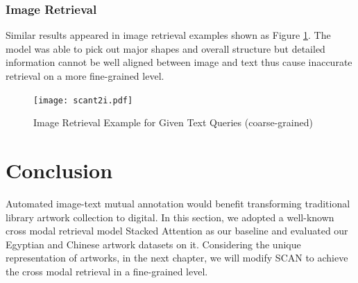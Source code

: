 \subsubsection{Image Retrieval}
Similar results appeared in image retrieval examples shown as Figure \ref{fig:scant2i}. The model was able to pick out major shapes and overall structure but detailed information cannot be well aligned between image and text thus cause inaccurate retrieval on a more fine-grained level.

\begin{figure}[h!]
\centering
\texttt{[image: scant2i.pdf]}
\caption{Image Retrieval Example for Given Text Queries (coarse-grained)}
\label{fig:scant2i}
\end{figure}


\section{Conclusion}
Automated image-text mutual annotation would benefit transforming traditional library artwork collection to digital. In this section, we adopted a well-known cross modal retrieval model Stacked Attention as our baseline and evaluated our Egyptian and Chinese artwork datasets on it. Considering the unique representation of artworks, in the next chapter, we will modify SCAN to achieve the cross modal retrieval in a fine-grained level.


